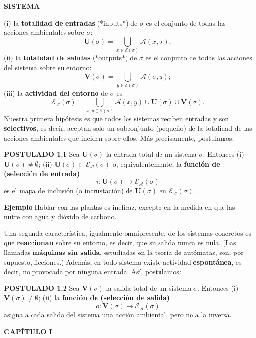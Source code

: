 \newpage
\fancyhf{}
\fancyhead[r]{\thepage}
\begin{center}
{\fontsize{16}{18}\selectfont \textbf{SISTEMA}}
\end{center}
\vspace{0.5cm}

{\fontsize{13}{15}\selectfont
(i) la \textbf{totalidad de entradas} (*inputs*) de $\sigma$ es el conjunto de todas las acciones ambientales sobre $\sigma$:
$$ \mathbf{U}(\sigma) = \bigcup_{x \in \mathcal{E}(\sigma)} \mathcal{A}(x, \sigma); $$
(ii) la \textbf{totalidad de salidas} (*outputs*) de $\sigma$ es el conjunto de todas las acciones del sistema sobre su entorno:
$$ \mathbf{V}(\sigma) = \bigcup_{y \in \mathcal{E}(\sigma)} \mathcal{A}(\sigma, y); $$
(iii) la \textbf{actividad del entorno} de $\sigma$ es
$$ \mathcal{E}_{\mathcal{A}}(\sigma) = \bigcup_{x, y \in \mathcal{E}(\sigma)} \mathcal{A}(x, y) \cup \mathbf{U}(\sigma) \cup \mathbf{V}(\sigma). $$
Nuestra primera hipótesis es que todos los sistemas reciben entradas y son \textbf{selectivos}, es decir, aceptan solo un subconjunto (pequeño) de la totalidad de las acciones ambientales que inciden sobre ellos. Más precisamente, postulamos:

\textbf{POSTULADO 1.1} Sea $\mathbf{U}(\sigma)$ la entrada total de un sistema $\sigma$. Entonces
(i) $\mathbf{U}(\sigma) \neq \emptyset$;
(ii) $\mathbf{U}(\sigma) \subset \mathcal{E}_{\mathcal{A}}(\sigma)$ o, equivalentemente, la \textbf{función de (selección de entrada)}
$$ i: \mathbf{U}(\sigma) \longrightarrow \mathcal{E}_{\mathcal{A}}(\sigma) $$
es el mapa de inclusión (o incrustación) de $\mathbf{U}(\sigma)$ en $\mathcal{E}_{\mathcal{A}}(\sigma)$.

\textbf{Ejemplo} Hablar con las plantas es ineficaz, excepto en la medida en que las nutre con agua y dióxido de carbono.

Una segunda característica, igualmente omnipresente, de los sistemas concretos es que \textbf{reaccionan} sobre su entorno, es decir, que su salida nunca es nula. (Las llamadas \textbf{máquinas sin salida}, estudiadas en la teoría de autómatas, son, por supuesto, ficciones.) Además, en todo sistema existe actividad \textbf{espontánea}, es decir, no provocada por ninguna entrada. Así, postulamos:

\textbf{POSTULADO 1.2} Sea $\mathbf{V}(\sigma)$ la salida total de un sistema $\sigma$. Entonces
(i) $\mathbf{V}(\sigma) \neq \emptyset$;
(ii) la \textbf{función de (selección de salida)}
$$ o: \mathbf{V}(\sigma) \longrightarrow \mathcal{E}_{\mathcal{A}}(\sigma) $$
asigna a cada salida del sistema una acción ambiental, pero no a la inversa.
}
\newpage
\fancyhf{}
\fancyhead[l]{\thepage}
\begin{center}
{\fontsize{16}{18}\selectfont \textbf{CAPÍTULO I}}
\end{center}
\vspace{0.5cm}

